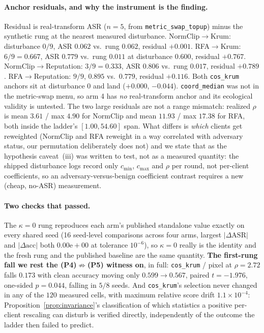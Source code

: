 \documentclass{article}
\begin{document}
\paragraph{Anchor residuals, and why the instrument is the finding.} Residual is real-transform ASR ($n{=}5$, from \texttt{metric\_swap\_topup}) minus the synthetic rung at the nearest measured disturbance. NormClip$\to$Krum: disturbance $0/9$, ASR $0.062$ vs.\ rung $0.062$, residual $+0.001$. RFA$\to$Krum: $6/9 = 0.667$, ASR $0.779$ vs.\ rung $0.011$ at disturbance $0.600$, residual $\mathbf{+0.767}$. NormClip$\to$Reputation: $3/9 = 0.333$, ASR $0.806$ vs.\ rung $0.017$, residual $\mathbf{+0.789}$. RFA$\to$Reputation: $9/9$, $0.895$ vs.\ $0.779$, residual $+0.116$. Both \texttt{cos\_krum} anchors sit at disturbance $0$ and land ($+0.000$, $-0.044$). \texttt{coord\_median} was not in the metric-swap menu, so arm 4 has \emph{no} real-transform anchor and its ecological validity is untested. The two large residuals are not a range mismatch: realized $\rho$ is mean $3.61$ / max $4.90$ for NormClip and mean $11.93$ / max $17.38$ for RFA, both inside the ladder's $[1.00, 54.60]$ span. What differs is \emph{which} clients get reweighted (NormClip and RFA reweight in a way correlated with adversary status, our permutation deliberately does not) and we state that as the hypothesis caveat~(iii) was written to test, not as a measured quantity: the shipped disturbance logs record only $c_{\min}$, $c_{\max}$ and $\rho$ per round, not per-client coefficients, so an adversary-versus-benign coefficient contrast requires a new (cheap, no-ASR) measurement.

\paragraph{Two checks that passed.} The $\kappa{=}0$ rung reproduces each arm's published standalone value exactly on every shared seed (16 seed-level comparisons across four arms, largest $|\Delta\text{ASR}|$ and $|\Delta\text{acc}|$ both $0.00\text{e}{+}00$ at tolerance $10^{-6}$), so $\kappa{=}0$ really is the identity and the fresh rung and the published baseline are the same quantity. \textbf{The first-rung fall we rest the (P4)$\not\Rightarrow$(P5) witness on}, in full: \texttt{cos\_krum} / pixel at $\rho{=}2.72$ falls $0.173$ with clean accuracy moving only $0.599 \to 0.567$, paired $t{=}{-}1.976$, one-sided $p{=}0.044$, falling in $5/8$ seeds. And \texttt{cos\_krum}'s selection never changed in any of the $120$ measured cells, with maximum relative score drift $1.1{\times}10^{-4}$: Proposition~\ref{prop:invariance}'s classification of which statistics a positive per-client rescaling can disturb is verified directly, independently of the outcome the ladder then failed to predict.
\end{document}
